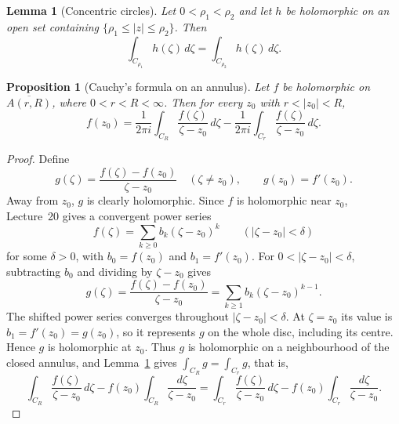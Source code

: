 \documentclass[11pt]{article}
\theoremstyle{plain}
\newtheorem{proposition}[theorem]{Proposition}
\newtheorem{lemma}[theorem]{Lemma}
\theoremstyle{definition}
\theoremstyle{boldremark}
\theoremstyle{remark}
\numberwithin{equation}{section}
\begin{document}
\begin{lemma}[Concentric circles]\label{lem:concentric}
Let $0<\rho_1<\rho_2$ and let $h$ be holomorphic on an open set containing
$\{\rho_1\leq|z|\leq\rho_2\}$. Then
\[
 \int_{C_{\rho_1}}h(\zeta)\,d\zeta=\int_{C_{\rho_2}}h(\zeta)\,d\zeta.
\]
\end{lemma}


\begin{proposition}[Cauchy's formula on an annulus]\label{prop:annulus-cauchy}
Let $f$ be holomorphic on $\overline{A(r,R)}$, where $0<r<R<\infty$. Then for
every $z_0$ with $r<|z_0|<R$,
\[
 \boxed{\displaystyle
 f(z_0)=\frac{1}{2\pi i}\int_{C_R}\frac{f(\zeta)}{\zeta-z_0}\,d\zeta
 -\frac{1}{2\pi i}\int_{C_r}\frac{f(\zeta)}{\zeta-z_0}\,d\zeta.}
\]
\end{proposition}
\begin{proof}
Define
\[
 g(\zeta)=\frac{f(\zeta)-f(z_0)}{\zeta-z_0}\quad(\zeta\ne z_0),
 \qquad g(z_0)=f'(z_0).
\]
Away from $z_0$, $g$ is clearly holomorphic. Since $f$ is holomorphic near
$z_0$, Lecture~20 gives a convergent power series
\[
 f(\zeta)=\sum_{k\geq0}b_k(\zeta-z_0)^k
 \qquad(|\zeta-z_0|<\delta)
\]
for some $\delta>0$, with $b_0=f(z_0)$ and $b_1=f'(z_0)$. For
$0<|\zeta-z_0|<\delta$, subtracting $b_0$ and dividing by $\zeta-z_0$ gives
\[
 g(\zeta)=\frac{f(\zeta)-f(z_0)}{\zeta-z_0}
 =\sum_{k\geq1}b_k(\zeta-z_0)^{k-1}.
\]
The shifted power series converges throughout $|\zeta-z_0|<\delta$.
At $\zeta=z_0$ its value is $b_1=f'(z_0)=g(z_0)$, so it represents $g$
on the whole disc, including its centre. Hence $g$ is holomorphic at
$z_0$. Thus $g$ is holomorphic on a neighbourhood of the closed
annulus, and Lemma~\ref{lem:concentric} gives
$\int_{C_R}g=\int_{C_r}g$, that is,
\[
 \int_{C_R}\frac{f(\zeta)}{\zeta-z_0}\,d\zeta
 -f(z_0)\int_{C_R}\frac{d\zeta}{\zeta-z_0}
 =\int_{C_r}\frac{f(\zeta)}{\zeta-z_0}\,d\zeta
 -f(z_0)\int_{C_r}\frac{d\zeta}{\zeta-z_0}.
\]


\end{proof}
\end{document}
